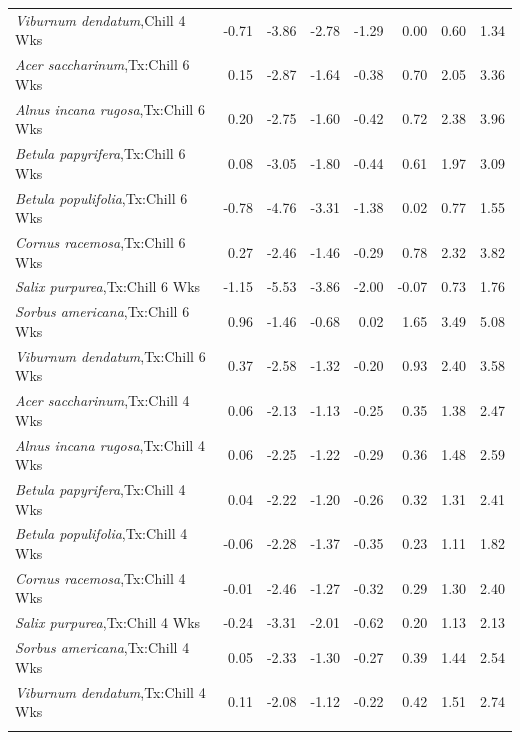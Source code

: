 \documentclass{article}\usepackage[]{graphicx}\usepackage[]{color}
\begin{document}
\begin{longtable}{lrrrrrrr}
  \textit{Viburnum dendatum},Chill 4 Wks & -0.71 & -3.86 & -2.78 & -1.29 & 0.00 & 0.60 & 1.34 \\ 
  \textit{Acer saccharinum},Tx:Chill 6 Wks & 0.15 & -2.87 & -1.64 & -0.38 & 0.70 & 2.05 & 3.36 \\ 
  \textit{Alnus incana rugosa},Tx:Chill 6 Wks & 0.20 & -2.75 & -1.60 & -0.42 & 0.72 & 2.38 & 3.96 \\ 
  \textit{Betula papyrifera},Tx:Chill 6 Wks & 0.08 & -3.05 & -1.80 & -0.44 & 0.61 & 1.97 & 3.09 \\ 
  \textit{Betula populifolia},Tx:Chill 6 Wks & -0.78 & -4.76 & -3.31 & -1.38 & 0.02 & 0.77 & 1.55 \\ 
  \textit{Cornus racemosa},Tx:Chill 6 Wks & 0.27 & -2.46 & -1.46 & -0.29 & 0.78 & 2.32 & 3.82 \\ 
  \textit{Salix purpurea},Tx:Chill 6 Wks & -1.15 & -5.53 & -3.86 & -2.00 & -0.07 & 0.73 & 1.76 \\ 
  \textit{Sorbus americana},Tx:Chill 6 Wks & 0.96 & -1.46 & -0.68 & 0.02 & 1.65 & 3.49 & 5.08 \\ 
  \textit{Viburnum dendatum},Tx:Chill 6 Wks & 0.37 & -2.58 & -1.32 & -0.20 & 0.93 & 2.40 & 3.58 \\ 
  \textit{Acer saccharinum},Tx:Chill 4 Wks & 0.06 & -2.13 & -1.13 & -0.25 & 0.35 & 1.38 & 2.47 \\ 
  \textit{Alnus incana rugosa},Tx:Chill 4 Wks & 0.06 & -2.25 & -1.22 & -0.29 & 0.36 & 1.48 & 2.59 \\ 
  \textit{Betula papyrifera},Tx:Chill 4 Wks & 0.04 & -2.22 & -1.20 & -0.26 & 0.32 & 1.31 & 2.41 \\ 
  \textit{Betula populifolia},Tx:Chill 4 Wks & -0.06 & -2.28 & -1.37 & -0.35 & 0.23 & 1.11 & 1.82 \\ 
  \textit{Cornus racemosa},Tx:Chill 4 Wks & -0.01 & -2.46 & -1.27 & -0.32 & 0.29 & 1.30 & 2.40 \\ 
  \textit{Salix purpurea},Tx:Chill 4 Wks & -0.24 & -3.31 & -2.01 & -0.62 & 0.20 & 1.13 & 2.13 \\ 
  \textit{Sorbus americana},Tx:Chill 4 Wks & 0.05 & -2.33 & -1.30 & -0.27 & 0.39 & 1.44 & 2.54 \\ 
  \textit{Viburnum dendatum},Tx:Chill 4 Wks & 0.11 & -2.08 & -1.12 & -0.22 & 0.42 & 1.51 & 2.74 \\ 
   \hline
\hline
\label{tab:suppmodchl}
\end{longtable}
\end{document}
